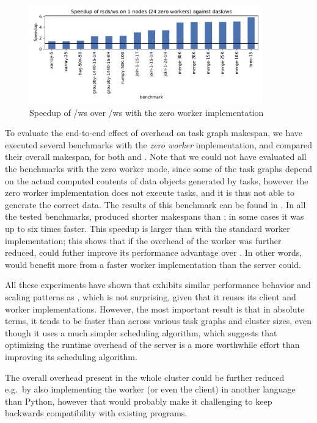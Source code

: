 \begin{figure}
	\centering
	\includegraphics[width=0.9\textwidth]{./imgs/rsds/charts/speedup-zw-rsds-ws-1}
	\caption{Speedup of \rsds{}/ws over \dask{}/ws with the zero worker
	implementation}
	\label{fig:rsds-zero-worker-speedup}
\end{figure}

To evaluate the end-to-end effect of overhead on task graph makespan, we have executed several
benchmarks with the \emph{zero worker} implementation, and compared their overall
makespan, for both \dask{} and \rsds{}. Note that we could
not have evaluated all the benchmarks with the zero worker mode, since some of the task graphs
depend on the actual computed contents of data objects generated by tasks, however the zero worker
implementation does not execute tasks, and it is thus not able to generate the correct data. The
results of this benchmark can be found in . In all the tested
benchmarks, \rsds{} produced shorter makespans than
\dask{}; in some cases it was up to six times faster. This speedup is larger
than with the standard worker implementation; this shows that if the overhead of the worker was
further reduced, \rsds{} could futher improve its performance advantage over
\dask{}. In other words, \rsds{} would benefit more from a
faster worker implementation than the \dask{} server could.

All these experiments have shown that \rsds{} exhibits similar performance
behavior and scaling patterns as \dask{}, which is not surprising, given that
it reuses its client and worker implementations. However, the most important result is that in
absolute terms, it tends to be faster than \dask{} across various task graphs
and cluster sizes, even though it uses a much simpler scheduling algorithm, which suggests that
optimizing the runtime overhead of the \dask{} server is a more worthwhile
effort than improving its scheduling algorithm.

The overall overhead present in the whole \rsds{} cluster could be further
reduced e.g.\ by also implementing the worker (or even the client) in another language than Python,
however that would probably make it challenging to keep backwards compatibility with existing
\dask{} programs.

